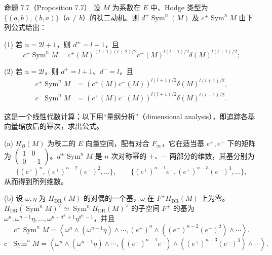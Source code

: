 \begin{originaltheorem}{命题 7.7（Proposition 7.7）}
设 $M$ 为系数在 $E$ 中、Hodge 类型为 $\{(a,b),(b,a)\}$（$a\ne b$）的秩二动机。则 $d^\pm\operatorname{Sym}^n(M)$ 及 $c^\pm\operatorname{Sym}^nM$ 由下列公式给出：

(1) 若 $n=2l+1$，则 $d^\pm=l+1$，且
\[
 c^\pm\operatorname{Sym}^nM
 =c^\pm(M)^{(l+1)(l+2)/2}
 c^\mp(M)^{l(l+1)/2}\delta(M)^{l(l+1)/2};
\]

(2) 若 $n=2l$，则 $d^+=l+1$、$d^-=l$，且
\[
\begin{aligned}
 c^+\operatorname{Sym}^nM
 &=(c^+(M)c^-(M))^{l(l+1)/2}\delta(M)^{l(l+1)/2},\\
 c^-\operatorname{Sym}^nM
 &=(c^+(M)c^-(M))^{l(l+1)/2}\delta(M)^{l(l-1)/2}.
\end{aligned}
\]
\end{originaltheorem}

这是一个线性代数计算；以下用“量纲分析”（dimensional analysis），即追踪各基向量缩放后的幂次，求出公式。

(a) $H_B(M)$ 为秩二的 $E$ 向量空间，配有对合 $F_\infty$，它在适当基 $e^+,e^-$ 下的矩阵为 $\left(\begin{smallmatrix}1&0\\0&-1\end{smallmatrix}\right)$。$d^\pm\operatorname{Sym}^nM$ 是 $n$ 次对称幂的 $+$、$-$ 两部分的维数，其基分别为
\[
 \{(e^+)^n,(e^+)^{n-2}(e^-)^2,\ldots\},\qquad
 \{(e^+)^{n-1}e^-,(e^+)^{n-3}(e^-)^3,\ldots\},
\]
从而得到所列维数。

(b) 设 $\omega,\eta$ 为 $H_{\mathrm{DR}}(M)$ 的对偶的一个基，$\omega$ 在 $F^+H_{\mathrm{DR}}(M)$ 上为零。
$H_{\mathrm{DR}}(\operatorname{Sym}^nM)^\vee\simeq\operatorname{Sym}^nH_{\mathrm{DR}}(M)^\vee$ 的子空间 $F^\pm$ 的基为
$\omega^n,\omega^{n-1}\eta,\ldots,\omega^{n-d^\pm+1}\eta^{d^\pm-1}$，并且
\begin{equation}
 c^+\operatorname{Sym}^nM
 =\left\langle\omega^n\wedge(\omega^{n-1}\eta)\wedge\cdots,
 (e^+)^n\wedge((e^+)^{n-2}(e^-)^2)\wedge\cdots\right\rangle.
 \tag{$7.7.1$+}
\end{equation}
\begin{equation}
 c^-\operatorname{Sym}^nM
 =\left\langle\omega^n\wedge(\omega^{n-1}\eta)\wedge\cdots,
 ((e^+)^{n-1}e^-)\wedge((e^+)^{n-3}(e^-)^3)\wedge\cdots\right\rangle.
 \tag{$7.7.1$-}
\end{equation}

